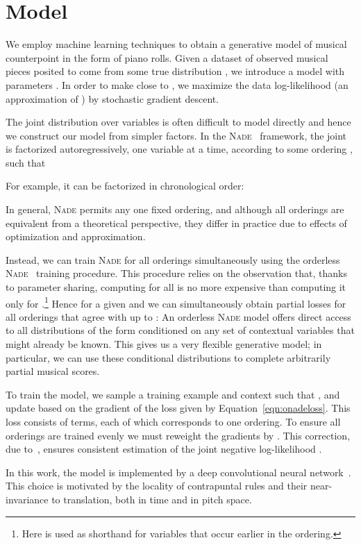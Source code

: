 \documentclass{article}
\newcommand{\nade}{\textsc{Nade}\xspace}
\begin{document}
\section{Model} \label{conv}
\label{sec:model}
We employ machine learning techniques to obtain a generative model of musical counterpoint in the form of piano rolls.
Given a dataset of observed musical pieces  posited to come from some true distribution ,
we introduce a model  with parameters .
In order to make  close to , we maximize the data log-likelihood  (an approximation of ) by stochastic gradient descent.

The joint distribution  over  variables  is often difficult to model directly and hence we construct our model  from simpler factors.
In the \nade~\cite{larochelle2011neural} framework, the joint  is factorized autoregressively, one variable at a time, according to some ordering ,
such that

For example, it can be factorized in chronological order:
 
 In general, \nade permits any one fixed ordering, and although all orderings are equivalent from a theoretical perspective,
they differ in practice due to effects of optimization and approximation.


Instead, we can train \nade for all orderings  simultaneously using the orderless \nade~\cite{uria2014deep} training procedure.
This procedure relies on the observation that, thanks to parameter sharing, computing
 for all  is no more expensive than computing it only for .\footnote{Here  is used as shorthand for variables  that occur earlier in the ordering.}
Hence for a given  and  we can simultaneously obtain partial losses for all orderings that agree with  up to :
An orderless \nade model offers direct access to all distributions of the form 
conditioned on any set of contextual variables  that might already be known.
This gives us a very flexible generative model; in particular, we can use these conditional distributions to complete arbitrarily partial musical scores.

To train the model, we sample a training example  and context  such that ,
and update  based on the gradient of the loss given by Equation~\ref{eqn:onadeloss}.
This loss consists of  terms, each of which corresponds to one ordering.
To ensure all orderings are trained evenly we must reweight the gradients by .
This correction, due to~\cite{uria2014deep}, ensures consistent estimation of the joint negative log-likelihood .


In this work, the model  is implemented by a deep convolutional neural network~\cite{krizhevsky2012imagenet}.
This choice is motivated by the locality of contrapuntal rules and their near-invariance to translation, both in time and in pitch space.
\end{document}
